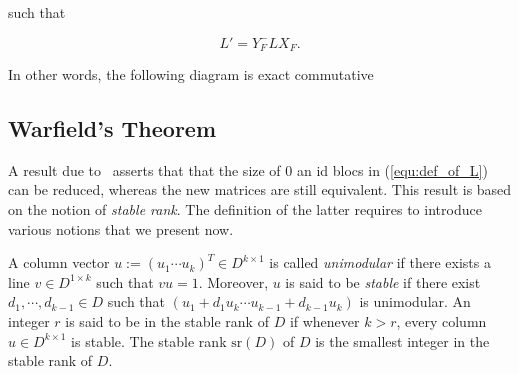 \documentclass{ifacconf}
\newcommand\sr{\text{sr}(D)}
\begin{document}
such that
\begin{small}
  \begin{equation}\label{equ:Fitting_eq}
    L'=Y_F^-LX_F.
  \end{equation}
\end{small}
\medskip
In other words, the following diagram is exact commutative
\begin{center}
  \end{center}



\vspace{-0.4cm}

\subsection{Warfield's Theorem}

A result due to~\cite{Wa:78} asserts that that the size of $0$ an id
blocs in (\ref{equ:def_of_L}) can be reduced, whereas the new matrices
are still equivalent. This result is based on the notion of
\emph{stable rank}. The definition of the latter requires to introduce
various notions that we present now.

A column vector $u:=(u_1\cdots u_k)^T\in D^{k\times 1}$ is called
\emph{unimodular} if there exists a line $v\in D^{1\times k}$ such that
$vu=1$. Moreover, $u$ is said to be \emph{stable} if there exist 
$d_1,\cdots,d_{k-1}\in D$ such that
$(u_1+d_1u_k\cdots u_{k-1}+d_{k-1}u_k)$ is unimodular. An integer $r$ is
said to be in the stable rank of $D$ if whenever $k>r$, every column
$u\in D^{k\times 1}$ is stable. The stable rank $\sr$ of $D$ is the
smallest integer in the stable rank of $D$.
\end{document}
